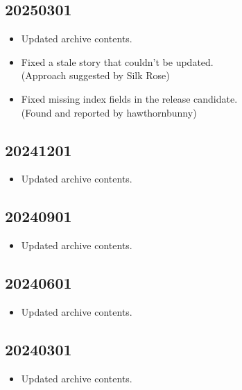 \documentclass[hidelinks,a4paper,12pt]{article}
\begin{document}
\subsection{20250301}  \label{sec:changelog_20250301}

\begin{itemize}
\item Updated archive contents.
\item Fixed a stale story that couldn't be updated.
  \\ (Approach suggested by Silk Rose)
\item Fixed missing index fields in the release candidate.
  \\ (Found and reported by hawthornbunny)
\end{itemize}

\subsection{20241201}  \label{sec:changelog_20241201}

\begin{itemize}
\item Updated archive contents.
\end{itemize}

\subsection{20240901}  \label{sec:changelog_20240901}

\begin{itemize}
\item Updated archive contents.
\end{itemize}

\subsection{20240601}  \label{sec:changelog_20240601}

\begin{itemize}
\item Updated archive contents.
\end{itemize}

\subsection{20240301}  \label{sec:changelog_20240301}

\begin{itemize}
\item Updated archive contents.
\end{itemize}
\end{document}
